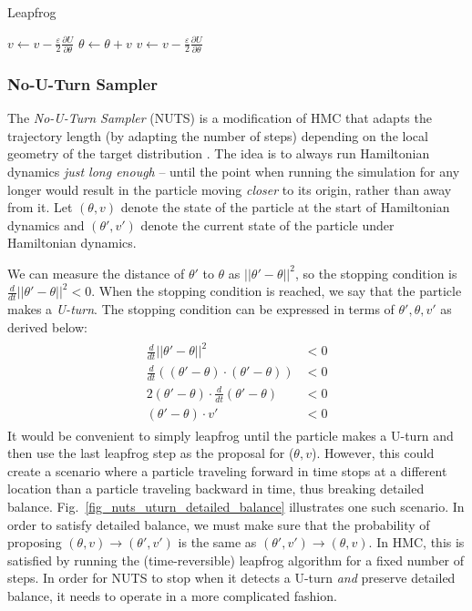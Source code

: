 \documentclass[12pt]{article}
\begin{document}
\begin{algorithm}
\caption{Leapfrog}
\label{alg_leapfrog}
\begin{algorithmic}
 
\State $v \gets v - \frac{\varepsilon}{2} \frac{\partial U}{\partial \theta}$ 
\State $\theta \gets \theta + v$ 
\State $v \gets v - \frac{\varepsilon}{2} \frac{\partial U}{\partial \theta}$ 
\EndFor
\end{algorithmic}
\end{algorithm}

\subsubsection{No-U-Turn Sampler}
\label{sec_nuts}

The \textit{No-U-Turn Sampler} (NUTS) is a modification of HMC that adapts the trajectory length (by adapting the number of steps) depending on the local geometry of the target distribution \cite{nuts}. The idea is to always run Hamiltonian dynamics \textit{just long enough} -- until the point when running the simulation for any longer would result in the particle moving \textit{closer} to its origin, rather than away from it. Let $(\theta, v)$ denote the state of the particle at the start of Hamiltonian dynamics and $(\theta', v')$ denote the current state of the particle under Hamiltonian dynamics.

We can measure the distance of $\theta'$ to $\theta$ as $||\theta'-\theta||^2$, so the stopping condition is $\frac{d}{dt} ||\theta'-\theta||^2 < 0$. When the stopping condition is reached, we say that the particle makes a \textit{U-turn}. The stopping condition can be expressed in terms of $\theta', \theta, v'$ as derived below:
\begin{align}
\begin{split}
\frac{d}{dt} ||\theta'-\theta||^2 &< 0 \\
\frac{d}{dt} \left((\theta'-\theta) \cdot (\theta'-\theta) \right) &< 0 \\
2(\theta'-\theta) \cdot \frac{d}{dt}(\theta'-\theta) &< 0 \\
(\theta'-\theta) \cdot v' &< 0
\end{split}
\label{eq_uturn}
\end{align}
It would be convenient to simply leapfrog until the particle makes a U-turn and then use the last leapfrog step as the proposal for ($\theta, v$). However, this could create a scenario where a particle traveling forward in time stops at a different location than a particle traveling backward in time, thus breaking detailed balance. Fig.\ \ref{fig_nuts_uturn_detailed_balance} illustrates one such scenario. In order to satisfy detailed balance, we must make sure that the probability of proposing $(\theta, v) \rightarrow (\theta', v')$ is the same as $(\theta', v') \rightarrow (\theta, v)$. In HMC, this is satisfied by running the (time-reversible) leapfrog algorithm for a fixed number of steps. In order for NUTS to stop when it detects a U-turn \textit{and} preserve detailed balance, it needs to operate in a more complicated fashion.
\end{document}
